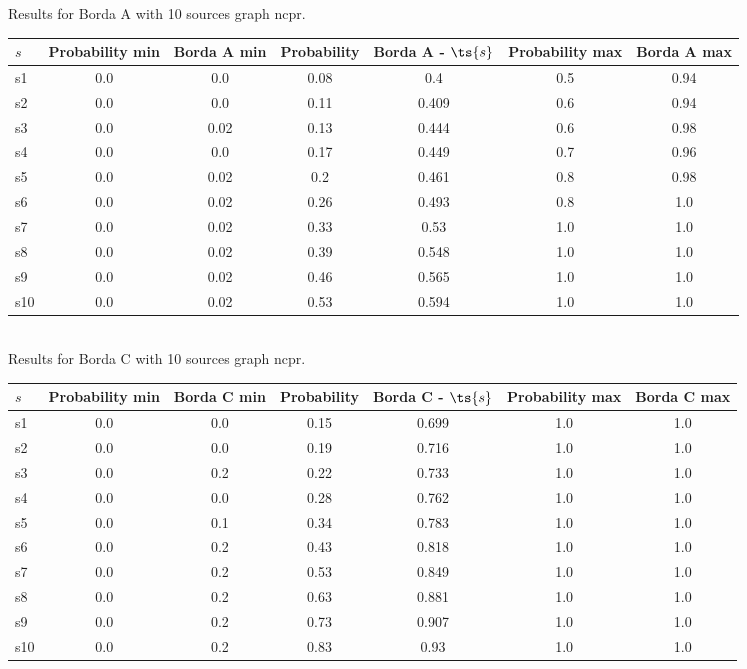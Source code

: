 \documentclass{article}
\begin{document}
\noindent Results for Borda A with 10 sources graph ncpr.

\noindent\begin{tabular}{|l|c|c|c|c|c|c|}
\hline
$s$& Probability min & Borda A min & Probability & Borda A - $\ts{s}$ & Probability max & Borda A max\\
\hline
s1 &0.0 & 0.0 & 0.08 & 0.4 & 0.5 & 0.94\\
\hline
s2 &0.0 & 0.0 & 0.11 & 0.409 & 0.6 & 0.94\\
\hline
s3 &0.0 & 0.02 & 0.13 & 0.444 & 0.6 & 0.98\\
\hline
s4 &0.0 & 0.0 & 0.17 & 0.449 & 0.7 & 0.96\\
\hline
s5 &0.0 & 0.02 & 0.2 & 0.461 & 0.8 & 0.98\\
\hline
s6 &0.0 & 0.02 & 0.26 & 0.493 & 0.8 & 1.0\\
\hline
s7 &0.0 & 0.02 & 0.33 & 0.53 & 1.0 & 1.0\\
\hline
s8 &0.0 & 0.02 & 0.39 & 0.548 & 1.0 & 1.0\\
\hline
s9 &0.0 & 0.02 & 0.46 & 0.565 & 1.0 & 1.0\\
\hline
s10 &0.0 & 0.02 & 0.53 & 0.594 & 1.0 & 1.0\\
\hline
\end{tabular}\\

\noindent Results for Borda C with 10 sources graph ncpr.

\noindent\begin{tabular}{|l|c|c|c|c|c|c|}
\hline
$s$& Probability min & Borda C min & Probability & Borda C - $\ts{s}$ & Probability max & Borda C max\\
\hline
s1 &0.0 & 0.0 & 0.15 & 0.699 & 1.0 & 1.0\\
\hline
s2 &0.0 & 0.0 & 0.19 & 0.716 & 1.0 & 1.0\\
\hline
s3 &0.0 & 0.2 & 0.22 & 0.733 & 1.0 & 1.0\\
\hline
s4 &0.0 & 0.0 & 0.28 & 0.762 & 1.0 & 1.0\\
\hline
s5 &0.0 & 0.1 & 0.34 & 0.783 & 1.0 & 1.0\\
\hline
s6 &0.0 & 0.2 & 0.43 & 0.818 & 1.0 & 1.0\\
\hline
s7 &0.0 & 0.2 & 0.53 & 0.849 & 1.0 & 1.0\\
\hline
s8 &0.0 & 0.2 & 0.63 & 0.881 & 1.0 & 1.0\\
\hline
s9 &0.0 & 0.2 & 0.73 & 0.907 & 1.0 & 1.0\\
\hline
s10 &0.0 & 0.2 & 0.83 & 0.93 & 1.0 & 1.0\\
\hline
\end{tabular}\\
\end{document}
